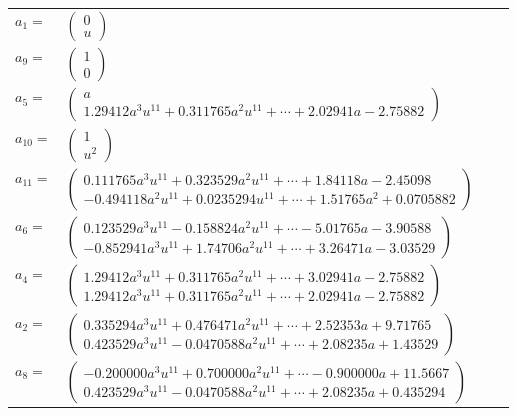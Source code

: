\documentclass[1p]{elsarticle_modified}
\theoremstyle{definition}
\begin{document}
\begin{tabular}{m{7pt} m{180pt} m{7pt} m{180pt} }
\flushright $a_{1}=$&$\begin{pmatrix}0\\u\end{pmatrix}$ \\
\flushright $a_{9}=$&$\begin{pmatrix}1\\0\end{pmatrix}$ \\
\flushright $a_{5}=$&$\begin{pmatrix}a\\1.29412 a^{3} u^{11}+0.311765 a^{2} u^{11}+\cdots+2.02941 a-2.75882\end{pmatrix}$ \\
\flushright $a_{10}=$&$\begin{pmatrix}1\\u^2\end{pmatrix}$ \\
\flushright $a_{11}=$&$\begin{pmatrix}0.111765 a^{3} u^{11}+0.323529 a^{2} u^{11}+\cdots+1.84118 a-2.45098\\-0.494118 a^{2} u^{11}+0.0235294 u^{11}+\cdots+1.51765 a^{2}+0.0705882\end{pmatrix}$ \\
\flushright $a_{6}=$&$\begin{pmatrix}0.123529 a^{3} u^{11}-0.158824 a^{2} u^{11}+\cdots-5.01765 a-3.90588\\-0.852941 a^{3} u^{11}+1.74706 a^{2} u^{11}+\cdots+3.26471 a-3.03529\end{pmatrix}$ \\
\flushright $a_{4}=$&$\begin{pmatrix}1.29412 a^{3} u^{11}+0.311765 a^{2} u^{11}+\cdots+3.02941 a-2.75882\\1.29412 a^{3} u^{11}+0.311765 a^{2} u^{11}+\cdots+2.02941 a-2.75882\end{pmatrix}$ \\
\flushright $a_{2}=$&$\begin{pmatrix}0.335294 a^{3} u^{11}+0.476471 a^{2} u^{11}+\cdots+2.52353 a+9.71765\\0.423529 a^{3} u^{11}-0.0470588 a^{2} u^{11}+\cdots+2.08235 a+1.43529\end{pmatrix}$ \\
\flushright $a_{8}=$&$\begin{pmatrix}-0.200000 a^{3} u^{11}+0.700000 a^{2} u^{11}+\cdots-0.900000 a+11.5667\\0.423529 a^{3} u^{11}-0.0470588 a^{2} u^{11}+\cdots+2.08235 a+0.435294\end{pmatrix}$ \\

\end{tabular}
\end{document}
